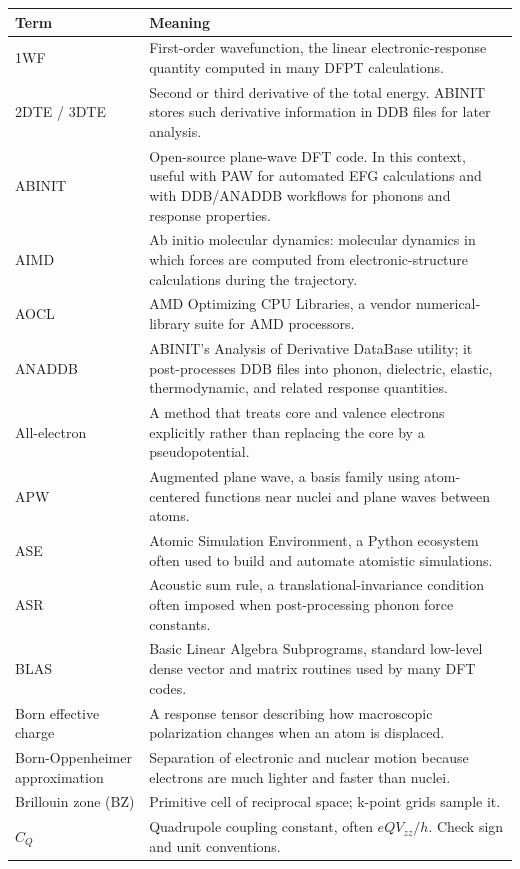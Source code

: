 \documentclass[11pt]{article}
\newcommand{\CQ}{C_Q}
\newcommand{\Vzz}{V_{zz}}
\begin{document}
\begin{longtable}{@{}L{0.18\textwidth}L{0.76\textwidth}@{}}
\toprule
\textbf{Term} & \textbf{Meaning} \\
\midrule
\endhead
1WF & First-order wavefunction, the linear electronic-response quantity computed in many DFPT calculations. \\
2DTE / 3DTE & Second or third derivative of the total energy.  ABINIT stores such derivative information in DDB files for later analysis. \\
ABINIT & Open-source plane-wave DFT code.  In this context, useful with PAW for automated EFG calculations and with DDB/ANADDB workflows for phonons and response properties. \\
AIMD & Ab initio molecular dynamics: molecular dynamics in which forces are computed from electronic-structure calculations during the trajectory. \\
AOCL & AMD Optimizing CPU Libraries, a vendor numerical-library suite for AMD processors. \\
ANADDB & ABINIT's Analysis of Derivative DataBase utility; it post-processes DDB files into phonon, dielectric, elastic, thermodynamic, and related response quantities. \\
All-electron & A method that treats core and valence electrons explicitly rather than replacing the core by a pseudopotential. \\
APW & Augmented plane wave, a basis family using atom-centered functions near nuclei and plane waves between atoms. \\
ASE & Atomic Simulation Environment, a Python ecosystem often used to build and automate atomistic simulations. \\
ASR & Acoustic sum rule, a translational-invariance condition often imposed when post-processing phonon force constants. \\
BLAS & Basic Linear Algebra Subprograms, standard low-level dense vector and matrix routines used by many DFT codes. \\
Born effective charge & A response tensor describing how macroscopic polarization changes when an atom is displaced. \\
Born-Oppenheimer approximation & Separation of electronic and nuclear motion because electrons are much lighter and faster than nuclei. \\
Brillouin zone (BZ) & Primitive cell of reciprocal space; k-point grids sample it. \\
$\CQ$ & Quadrupole coupling constant, often $eQ\Vzz/h$.  Check sign and unit conventions. \\

\end{longtable}
\end{document}
